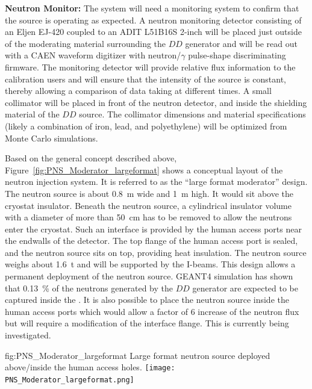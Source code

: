  
{\bf Neutron Monitor:} The system will need a monitoring system to confirm that the source is operating as expected.  A neutron monitoring detector consisting of an Eljen EJ-420 coupled to an ADIT L51B16S \num{2}-inch  will be placed just outside of the moderating material surrounding the $DD$ generator and will be read out with a CAEN waveform digitizer with neutron/$\gamma$ pulse-shape discriminating firmware. The monitoring detector will provide relative flux information to the calibration users and will ensure that the intensity of the source is constant, thereby allowing a comparison of data taking at different times.  A small collimator will be placed in front of the neutron detector, and inside the shielding material of the $DD$ source. The collimator dimensions and material specifications (likely a combination of iron, lead, and polyethylene) will be optimized from Monte Carlo simulations.

Based on the general concept described above, Figure~\ref{fig:PNS_Moderator_largeformat} shows a conceptual layout of the neutron injection system. It is referred to as the ``large format moderator'' design. The neutron source is about \SI{0.8}{\m} wide and \SI{1}{\m} high. It would sit above the cryostat insulator. Beneath the neutron source, a cylindrical insulator volume with a diameter of more than \SI{50}{\cm} has to be removed to allow the neutrons enter the cryostat. Such an interface is provided by the human access ports near the endwalls of the detector.
The top flange of the human access port is sealed, and the neutron source sits on top, providing heat insulation. The neutron source weighs about \SI{1.6}{\tonne} and will be supported by the I-beams. 
This design allows a permanent deployment of the neutron source. GEANT4 simulation has shown that \SI{0.13}{\%} of the neutrons generated by the $DD$ generator are expected to be captured inside the . It is also possible to place the neutron source inside the human access ports which would allow a factor of \num{6} increase of the neutron flux but will require a modification of the interface flange. This is currently being investigated.

\begin{dunefigure}{fig:PNS_Moderator_largeformat}
{Large format neutron source deployed above/inside the human access holes.}
\texttt{[image: PNS\_Moderator\_largeformat.png]}
\end{dunefigure}



